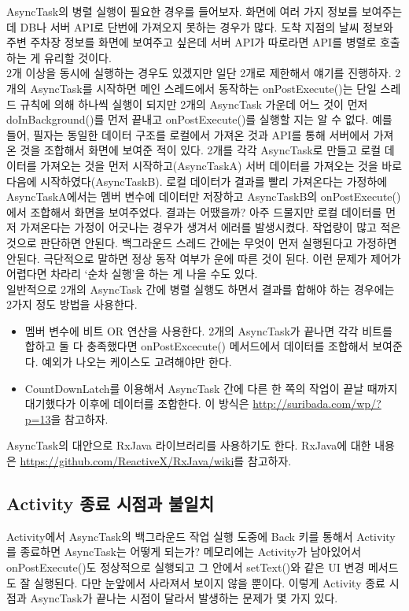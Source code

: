 AsyncTask의 병렬 실행이 필요한 경우를 들어보자. 
화면에 여러 가지 정보를 보여주는 데 DB나 서버 API로 단번에 가져오지 못하는 경우가 많다. 도착 지점의 날씨 정보와 주변 주차장 정보를 화면에 보여주고 싶은데 서버 API가 따로라면 API를 병렬로 호출하는 게 유리할 것이다.\\

2개 이상을 동시에 실행하는 경우도 있겠지만 일단 2개로 제한해서 얘기를 진행하자.   
2개의 AsyncTask를 시작하면 메인 스레드에서 동작하는 onPostExecute()는 단일 스레드 규칙에 의해 하나씩 실행이 되지만 2개의 AsyncTask 가운데 어느 것이 먼저 doInBackground()를 먼저 끝내고 onPostExecute()를 실행할 지는 알 수 없다. 
예를 들어, 필자는 동일한 데이터 구조를 로컬에서 가져온 것과 API를 통해 서버에서 가져온 것을 조합해서 화면에 보여준 적이 있다. 
2개를 각각 AsyncTask로 만들고 로컬 데이터를 가져오는 것을 먼저 시작하고(AsyncTaskA) 서버 데이터를 가져오는 것을 바로 다음에 시작하였다(AsyncTaskB). 
로컬 데이터가 결과를 빨리 가져온다는 가정하에 AsyncTaskA에서는 멤버 변수에 데이터만 저장하고 AsyncTaskB의 onPostExecute()에서 조합해서 화면을 보여주었다.
결과는 어땠을까? 아주 드물지만 로컬 데이터를 먼저 가져온다는 가정이 어긋나는 경우가 생겨서 에러를 발생시켰다. 
작업량이 많고 적은 것으로 판단하면 안된다.
백그라운드 스레드 간에는 무엇이 먼저 실행된다고 가정하면 안된다. 극단적으로 말하면 정상 동작 여부가 운에 따른 것이 된다.
이런 문제가 제어가 어렵다면 차라리 `순차 실행'을 하는 게 나을 수도 있다.\\

일반적으로 2개의 AsyncTask 간에 병렬 실행도 하면서 결과를 합해야 하는 경우에는 2가지 정도 방법을 사용한다.
\begin{itemize}
\item 멤버 변수에 비트 OR 연산을 사용한다. 2개의 AsyncTask가 끝나면 각각 비트를 합하고 둘 다 충족했다면 onPostExcecute() 메서드에서 데이터를 조합해서 보여준다. 예외가 나오는 케이스도 고려해야만 한다. 
\item CountDownLatch를 이용해서 AsyncTask 간에 다른 한 쪽의 작업이 끝날 때까지 대기했다가 이후에 데이터를 조합한다. 이 방식은 \url{http://suribada.com/wp/?p=13}을 참고하자.
\end{itemize}

AsyncTask의 대안으로 RxJava 라이브러리를 사용하기도 한다. RxJava에 대한 내용은 \url{https://github.com/ReactiveX/RxJava/wiki}를 참고하자.

\subsection{Activity 종료 시점과 불일치}
Activity에서 AsyncTask의 백그라운드 작업 실행 도중에 Back 키를 통해서 Activity를 종료하면 AsyncTask는 어떻게 되는가? 메모리에는 Activity가 남아있어서 onPostExecute()도 정상적으로 실행되고 그 안에서 setText()와 같은 UI 변경 메서드도 잘 실행된다. 다만 눈앞에서 사라져서 보이지 않을 뿐이다.
이렇게 Activity 종료 시점과 AsyncTask가 끝나는 시점이 달라서 발생하는 문제가 몇 가지 있다.\\

